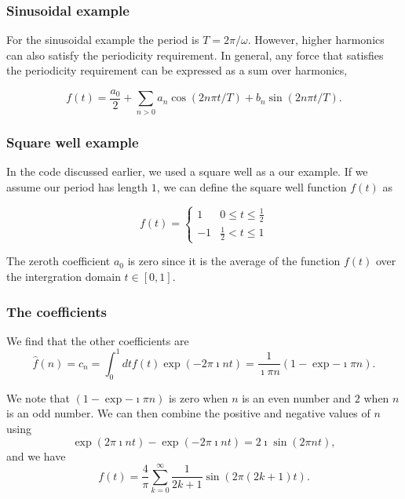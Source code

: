 \documentclass{beamer}
\begin{document}
\begin{frame}
\frametitle{Sinusoidal example}

For the sinusoidal example the
period is $T=2\pi/\omega$. However, higher harmonics can also
satisfy the periodicity requirement. In general, any force that
satisfies the periodicity requirement can be expressed as a sum over
harmonics,

\[
f(t)=\frac{a_0}{2}+\sum_{n>0} a_n\cos(2n\pi t/T)+b_n\sin(2n\pi t/T).
\]
\end{frame}

\begin{frame}
\frametitle{Square well example}

In the code discussed earlier, we used a square well as a our
example. If we assume our period has length $1$, we can define the
square well function $f(t)$ as

\[
f(t)=\left\{\begin{array}{cc} 1 & 0 \le t \le \frac{1}{2} \\
                              -1 & \frac{1}{2} < t \le 1\end{array}\right.
\]

The zeroth coefficient $a_0$ is zero since it is the average of the function $f(t)$ over the intergration domain $t\in [0,1]$.
\end{frame}

\begin{frame}
\frametitle{The coefficients}

We find that the other coefficients are
\[
\hat{f}(n)=c_n=\int_0^1 dt f(t)\exp{(-2\pi\imath nt)}=\frac{1}{\imath\pi n}\left(1-\exp{-\imath\pi n}\right).
\]

We note that $(1-\exp{-\imath\pi n})$ is zero when $n$ is an even
number and $2$ when $n$ is an odd number. We can then combine the
positive and negative values of $n$ using
\[
\exp{(2\pi\imath nt)}-\exp{(-2\pi\imath nt)}=2\imath \sin{(2\pi nt)},
\]
and we have
\[
f(t)=\frac{4}{\pi}\sum_{k=0}^{\infty}\frac{1}{2k+1}\sin{(2\pi(2k+1)t)}.
\]
\end{frame}
\end{document}
